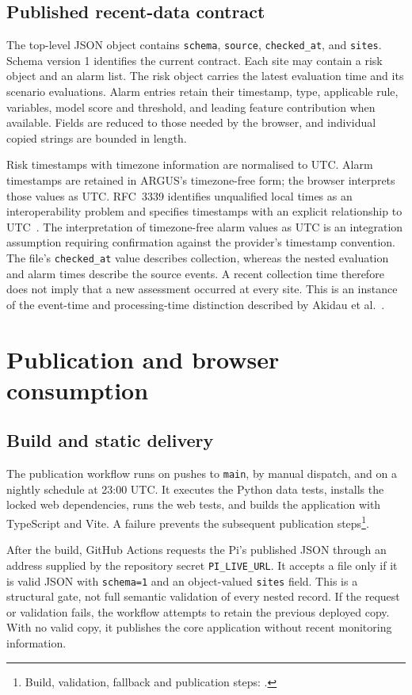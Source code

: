 \documentclass[10pt,a4paper]{article}
\begin{document}
\subsection{Published recent-data contract}
The top-level JSON object contains \texttt{schema}, \texttt{source}, \texttt{checked\_at}, and \texttt{sites}. Schema version 1 identifies the current contract. Each site may contain a risk object and an alarm list. The risk object carries the latest evaluation time and its scenario evaluations. Alarm entries retain their timestamp, type, applicable rule, variables, model score and threshold, and leading feature contribution when available. Fields are reduced to those needed by the browser, and individual copied strings are bounded in length.

Risk timestamps with timezone information are normalised to UTC. Alarm timestamps are retained in ARGUS's timezone-free form; the browser interprets those values as UTC. RFC~3339 identifies unqualified local times as an interoperability problem and specifies timestamps with an explicit relationship to UTC~\cite{timestamps2002}. The interpretation of timezone-free alarm values as UTC is an integration assumption requiring confirmation against the provider's timestamp convention. The file's \texttt{checked\_at} value describes collection, whereas the nested evaluation and alarm times describe the source events. A recent collection time therefore does not imply that a new assessment occurred at every site. This is an instance of the event-time and processing-time distinction described by Akidau et al.~\cite{akidau2015}.

\section{Publication and browser consumption}
\subsection{Build and static delivery}
The publication workflow runs on pushes to \texttt{main}, by manual dispatch, and on a nightly schedule at 23:00 UTC. It executes the Python data tests, installs the locked web dependencies, runs the web tests, and builds the application with TypeScript and Vite. A failure prevents the subsequent publication steps\footnote{Build, validation, fallback and publication steps: .}.

After the build, GitHub Actions requests the Pi's published JSON through an address supplied by the repository secret \texttt{PI\_LIVE\_URL}. It accepts a file only if it is valid JSON with \texttt{schema=1} and an object-valued \texttt{sites} field. This is a structural gate, not full semantic validation of every nested record. If the request or validation fails, the workflow attempts to retain the previous deployed copy. With no valid copy, it publishes the core application without recent monitoring information.
\end{document}
